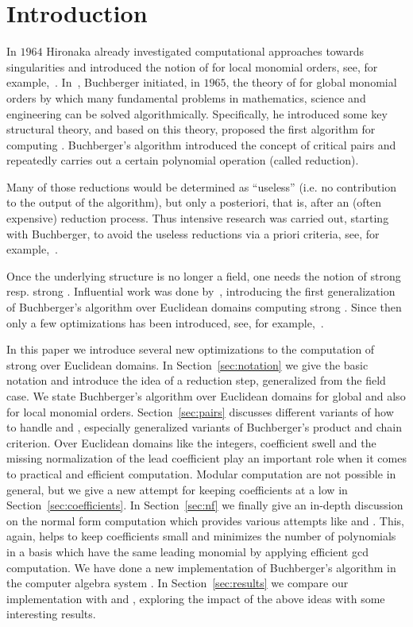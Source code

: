 \section{Introduction}
\label{sec:intro} In $1964$ Hironaka already investigated
computational approaches towards singularities and introduced the notion of
\stbs for local monomial orders, see, for
example,~\cite{hironaka11964, hironaka21964}.
In~\cite{bGroebner1965, bGroebner1965eng}, Buchberger initiated, in $1965$, the theory
of \gbs for global monomial orders by which many fundamental problems in mathematics, science
and engineering can be solved algorithmically. Specifically, he introduced some key
structural theory, and based on
this theory, proposed the first algorithm for computing \gbs.
Buchberger's algorithm introduced the concept of critical pairs and repeatedly carries out a certain
polynomial operation (called reduction).

Many of those reductions would be
determined as ``useless'' (i.e. no contribution to the output of the algorithm),
but only a posteriori, that is, after an (often expensive) reduction process.
Thus intensive research was carried out, starting with Buchberger, to avoid the
useless reductions via a priori criteria, see,  for
example,~\cite{bGroebnerCriterion1979,buchberger2ndCriterion1985,gmInstallation1988}.

Once the underlying structure is no longer a field, one needs
the notion of strong \gbs resp. strong \stbs. Influential work was done
by~\cite{kapur1988}, introducing the first generalization of Buchberger's
algorithm over Euclidean domains computing strong \gbs. Since then only a few
optimizations has been introduced, see, for example,~\cite{Wienand2011,
    lichtblau2012, eppSigZ2017}.

In this paper we introduce several new optimizations to the computation of
strong \stbs over Euclidean domains. In Section~\ref{sec:notation} we give the
basic notation and introduce the idea of a reduction step, generalized from the
field case. We state
Buchberger's algorithm over Euclidean domains for global and also for local
monomial orders. Section~\ref{sec:pairs} discusses different variants of how to
handle \spts and \gpts, especially generalized variants of Buchberger's product
and chain criterion. Over Euclidean domains like the integers, coefficient swell
and the missing normalization of the lead coefficient play an important role when it
comes to practical and efficient computation. Modular computation are not
possible in general, but we give a new attempt for keeping coefficients at a low
in Section~\ref{sec:coefficients}. In Section~\ref{sec:nf} we finally give an
in-depth discussion on the normal form computation which provides various attempts
like \ltrs and \lcrs. This, again, helps to keep coefficients small and
minimizes the number of polynomials in a basis which have the same
leading monomial by applying efficient gcd computation.
We have done a new implementation of Buchberger's algorithm in the computer
algebra system \singular. In Section~\ref{sec:results} we compare our implementation
with \macaulay and \magma, exploring the impact of the above ideas with
some interesting results.
